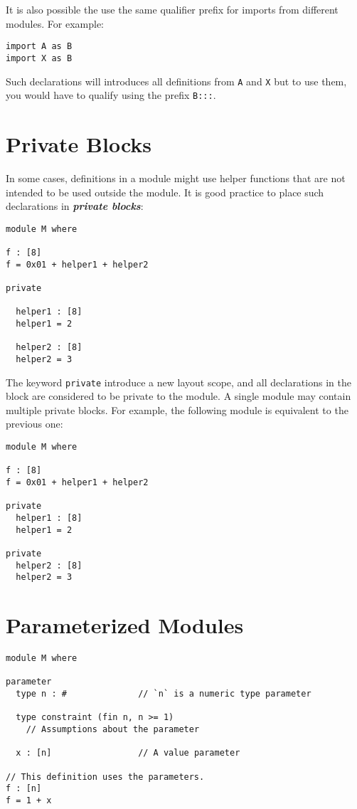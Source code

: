 It is also possible the use the same qualifier prefix for imports from
different modules. For example:

\begin{verbatim}
import A as B
import X as B
\end{verbatim}

Such declarations will introduces all definitions from \texttt{A} and
\texttt{X} but to use them, you would have to qualify using the prefix
\texttt{B:::}.

\section{Private Blocks}\label{private-blocks}

In some cases, definitions in a module might use helper functions that
are not intended to be used outside the module. It is good practice to
place such declarations in \textbf{\emph{private blocks}}:

\begin{verbatim}
module M where

f : [8]
f = 0x01 + helper1 + helper2

private

  helper1 : [8]
  helper1 = 2

  helper2 : [8]
  helper2 = 3
\end{verbatim}

The keyword \texttt{private} introduce a new layout scope, and all
declarations in the block are considered to be private to the module. A
single module may contain multiple private blocks. For example, the
following module is equivalent to the previous one:

\begin{verbatim}
module M where

f : [8]
f = 0x01 + helper1 + helper2

private
  helper1 : [8]
  helper1 = 2

private
  helper2 : [8]
  helper2 = 3
\end{verbatim}

\section{Parameterized Modules}\label{parameterized-modules}

\begin{verbatim}
module M where

parameter
  type n : #              // `n` is a numeric type parameter

  type constraint (fin n, n >= 1)
    // Assumptions about the parameter

  x : [n]                 // A value parameter

// This definition uses the parameters.
f : [n]
f = 1 + x
\end{verbatim}

